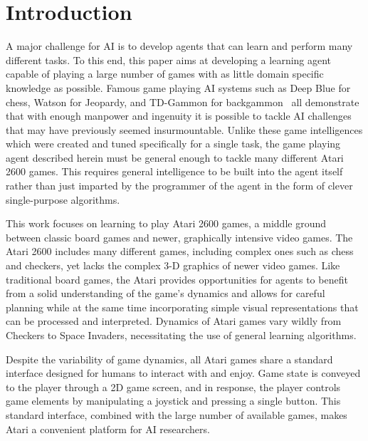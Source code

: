 \documentclass{sig-alternate}
\begin{document}
\section{Introduction}
A major challenge for AI is to develop agents that can learn and perform many different tasks. To this end, this paper aims at developing a learning agent capable of playing a large number of games with as little domain specific knowledge as possible. Famous game playing AI systems such as Deep Blue for chess, Watson for Jeopardy, and TD-Gammon for backgammon~\cite{tesauro_94} all demonstrate that with enough manpower and ingenuity it is possible to tackle AI challenges that may have previously seemed insurmountable. Unlike these game intelligences which were created and tuned specifically for a single task, the game playing agent described herein must be general enough to tackle many different Atari 2600 games. This requires general intelligence to be built into the agent itself rather than just imparted by the programmer of the agent in the form of clever single-purpose algorithms.

This work focuses on learning to play Atari 2600 games, a middle ground between classic board games and newer, graphically intensive video games. The Atari 2600 includes many different games, including complex ones such as chess and checkers, yet lacks the complex 3-D graphics of newer video games. Like traditional board games, the Atari provides opportunities for agents to benefit from a solid understanding of the game's dynamics and allows for careful planning while at the same time incorporating simple visual representations that can be processed and interpreted. Dynamics of Atari games vary wildly from Checkers to Space Invaders, necessitating the use of general learning algorithms.

Despite the variability of game dynamics, all Atari games share a standard interface designed for humans to interact with and enjoy. Game state is conveyed to the player through a 2D game screen, and in response, the player controls game elements by manipulating a joystick and pressing a single button. This standard interface, combined with the large number of available games, makes Atari a convenient platform for AI researchers. 
\end{document}
